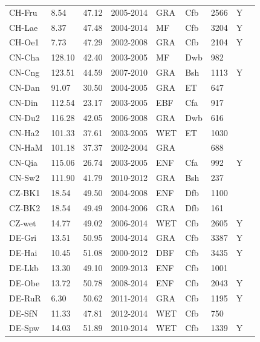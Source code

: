 \documentclass{myreport}
\begin{document}
\begin{longtable}{lllllllll}
  CH-Fru & 8.54 & 47.12 & 2005-2014 & GRA & Cfb & 2566 & Y & \citet{CH-Fru} \\ 
  CH-Lae & 8.37 & 47.48 & 2004-2014 & MF & Cfb & 3204 & Y & \citet{CH-Lae} \\ 
  CH-Oe1 & 7.73 & 47.29 & 2002-2008 & GRA & Cfb & 2104 & Y & \citet{CH-Oe1} \\ 
  CN-Cha & 128.10 & 42.40 & 2003-2005 & MF & Dwb & 982 &  & \citet{CN-Cha} \\ 
  CN-Cng & 123.51 & 44.59 & 2007-2010 & GRA & Bsh & 1113 & Y & \citet{CN-Cng} \\ 
  CN-Dan & 91.07 & 30.50 & 2004-2005 & GRA & ET & 647 &  & \citet{CN-Dan} \\ 
  CN-Din & 112.54 & 23.17 & 2003-2005 & EBF & Cfa & 917 &  & \citet{CN-Din} \\ 
  CN-Du2 & 116.28 & 42.05 & 2006-2008 & GRA & Dwb & 616 &  & \citet{CN-Du2} \\ 
  CN-Ha2 & 101.33 & 37.61 & 2003-2005 & WET & ET & 1030 &  & \citet{CN-Ha2} \\ 
  CN-HaM & 101.18 & 37.37 & 2002-2004 & GRA &  & 688 &  & \citet{CN-HaM} \\ 
  CN-Qia & 115.06 & 26.74 & 2003-2005 & ENF & Cfa & 992 & Y & \citet{CN-Qia} \\ 
  CN-Sw2 & 111.90 & 41.79 & 2010-2012 & GRA & Bsh & 237 &  & \citet{CN-Sw2} \\ 
  CZ-BK1 & 18.54 & 49.50 & 2004-2008 & ENF & Dfb & 1100 &  & \citet{CZ-BK1} \\ 
  CZ-BK2 & 18.54 & 49.49 & 2004-2006 & GRA & Dfb & 161 &  & \citet{CZ-BK2} \\ 
  CZ-wet & 14.77 & 49.02 & 2006-2014 & WET & Cfb & 2605 & Y & \citet{CZ-wet} \\ 
  DE-Gri & 13.51 & 50.95 & 2004-2014 & GRA & Cfb & 3387 & Y & \citet{DE-Gri} \\ 
  DE-Hai & 10.45 & 51.08 & 2000-2012 & DBF & Cfb & 3435 & Y & \citet{DE-Hai} \\ 
  DE-Lkb & 13.30 & 49.10 & 2009-2013 & ENF & Cfb & 1001 &  & \citet{DE-Lkb} \\ 
  DE-Obe & 13.72 & 50.78 & 2008-2014 & ENF & Cfb & 2043 & Y & \citet{DE-Obe} \\ 
  DE-RuR & 6.30 & 50.62 & 2011-2014 & GRA & Cfb & 1195 & Y & \citet{DE-RuR} \\ 
  DE-SfN & 11.33 & 47.81 & 2012-2014 & WET & Cfb & 750 &  & \citet{DE-SfN} \\ 
  DE-Spw & 14.03 & 51.89 & 2010-2014 & WET & Cfb & 1339 & Y & \citet{DE-Spw} \\ 

\end{longtable}
\end{document}
